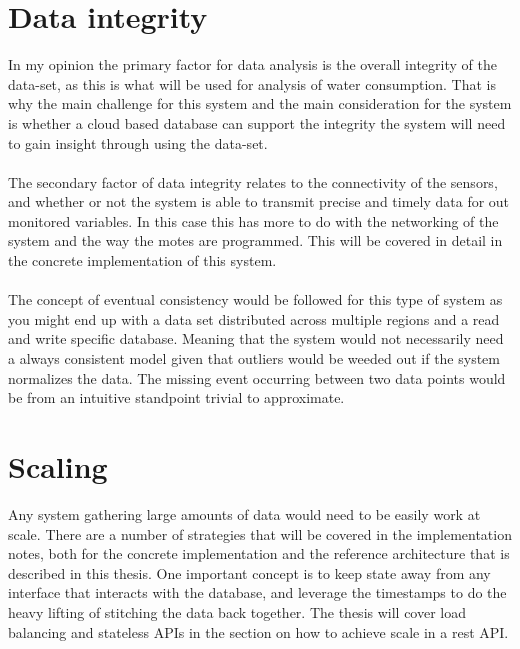 \documentclass[]{uiophd}
\begin{document}
\section{Data integrity}
In my opinion the primary factor for data analysis is the overall integrity of the data-set, as this is what will be used for analysis of water consumption. That is why the main challenge for this system and the main consideration for the system is whether a cloud based database can support the integrity the system will need to gain insight through using the data-set. 
\\\\
The secondary factor of data integrity relates to the connectivity of the sensors, and whether or not the system is able to transmit precise and timely data for out monitored variables. In this case this has  more to do with the networking of the system and the way the motes are programmed. This will be covered in detail in the concrete implementation of this system.
\\\\
The concept of eventual consistency would be followed for this type of system as you might end up with a data set distributed across multiple regions and a read and write specific database. Meaning that the system would not necessarily need a always consistent model given that outliers would be weeded out if the system normalizes the data. The missing event occurring between two data points would be from an intuitive standpoint trivial to approximate.
\section{Scaling}
Any system gathering large amounts of data would need to be easily work at scale. There are a number of strategies that will be covered in the implementation notes, both for the concrete implementation and the reference architecture that is described in this thesis. One important concept is to keep state away from any interface that interacts with the database, and leverage the timestamps to do the heavy lifting of stitching the data back together. The thesis will cover load balancing and stateless APIs in the section on how to achieve scale in a rest API.
\end{document}
